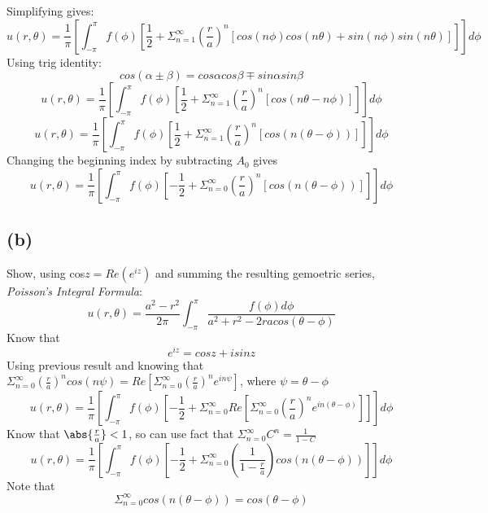 \documentclass[preview,12pt]{article}
\begin{document}
        Simplifying gives:
        $$u(r,\theta)=\frac{1}{\pi}\left[\int_{-\pi}^\pi f(\phi)\left[\frac{1}{2}+\Sigma_{n=1}^\infty \left(\frac{r}{a}\right)^n\left[cos(n\phi)cos(n\theta)+sin(n\phi)sin(n\theta) \right]\right]\right]d\phi$$
        Using trig identity:
        $$cos(\alpha \pm \beta)=cos\alpha cos\beta \mp sin\alpha sin\beta$$
        $$u(r,\theta)=\frac{1}{\pi}\left[\int_{-\pi}^\pi f(\phi)\left[\frac{1}{2}+\Sigma_{n=1}^\infty \left(\frac{r}{a}\right)^n\left[cos(n\theta - n\phi) \right]\right]\right]d\phi$$
        $$u(r,\theta)=\frac{1}{\pi}\left[\int_{-\pi}^\pi f(\phi)\left[\frac{1}{2}+\Sigma_{n=1}^\infty \left(\frac{r}{a}\right)^n\left[cos(n(\theta-\phi)) \right]\right]\right]d\phi$$
        Changing the beginning index by subtracting $A_0$ gives
        $$u(r,\theta)=\frac{1}{\pi}\left[\int_{-\pi}^\pi f(\phi)\left[-\frac{1}{2}+\Sigma_{n=0}^\infty \left(\frac{r}{a}\right)^n\left[cos(n(\theta-\phi)) \right]\right]\right]d\phi$$
        
    \subsection*{(b)}
        Show, using cos$z=Re(e^{iz})$ and summing the resulting gemoetric series, \textit{Poisson's Integral Formula}:
        $$u(r,\theta)=\frac{a^2-r^2}{2\pi}\int_{-\pi}^\pi\frac{f(\phi)d\phi}{a^2+r^2-2racos(\theta-\phi)}$$
        Know that
        $$e^{iz}=cosz+isinz$$
        Using previous result and knowing that $\Sigma_{n=0}^\infty \left(\frac{r}{a}\right)^ncos(n\psi)=Re\left[\Sigma_{n=0}^\infty \left(\frac{r}{a}\right)^ne^{in\psi}\right]$, where $\psi=\theta-\phi$
        $$u(r,\theta)=\frac{1}{\pi}\left[\int_{-\pi}^\pi f(\phi)\left[-\frac{1}{2}+\Sigma_{n=0}^\infty Re\left[\Sigma_{n=0}^\infty \left(\frac{r}{a}\right)^ne^{in(\theta-\phi)}\right]\right]\right]d\phi$$
        Know that $\abs{\frac{r}{a}}<1$, so can use fact that $\Sigma_{n=0}^\infty C^n=\frac{1}{1-C}$
        $$u(r,\theta)=\frac{1}{\pi}\left[\int_{-\pi}^\pi f(\phi)\left[-\frac{1}{2}+\Sigma_{n=0}^\infty \left(\frac{1}{1-\frac{r}{a}}\right)cos(n(\theta-\phi))\right]\right]d\phi$$
        Note that 
        $$\Sigma_{n=0}^\infty cos(n(\theta-\phi)) = cos(\theta-\phi)$$
        
\end{document}
